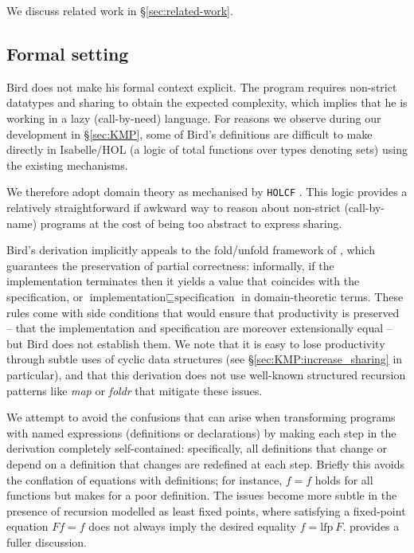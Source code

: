 \documentclass[11pt,a4paper]{article}
\begin{document}
We discuss related work in \S\ref{sec:related-work}.


\subsection{Formal setting\label{sec:formal_setting}}

Bird does not make his formal context explicit. The program requires
non-strict datatypes and sharing to obtain the expected complexity,
which implies that he is working in a lazy (call-by-need)
language. For reasons we observe during our development in
\S\ref{sec:KMP}, some of Bird's definitions are difficult to make
directly in Isabelle/HOL (a logic of total functions over types
denoting sets) using the existing mechanisms.

We therefore adopt domain theory as mechanised by \texttt{HOLCF}
\citep{HOLCF:1999}. This logic provides a relatively straightforward
if awkward way to reason about non-strict (call-by-name) programs at
the cost of being too abstract to express sharing.

Bird's derivation implicitly appeals to the fold/unfold framework of
\citet{BurstallDarlington:1977}, which guarantees the preservation of
partial correctness: informally, if the implementation terminates then
it yields a value that coincides with the specification, or
$\mbox{implementation} \sqsubseteq \mbox{specification}$ in
domain-theoretic terms. These rules come with side conditions that
would ensure that productivity is preserved -- that the implementation
and specification are moreover extensionally equal -- but Bird does
not establish them. We note that it is easy to lose productivity
through subtle uses of cyclic data structures (see
\S\ref{sec:KMP:increase_sharing} in particular), and that this
derivation does not use well-known structured recursion patterns like
\emph{map} or \emph{foldr} that mitigate these issues.

We attempt to avoid the confusions that can arise when transforming
programs with named expressions (definitions or declarations) by
making each step in the derivation completely self-contained:
specifically, all definitions that change or depend on a definition
that changes are redefined at each step. Briefly this avoids the
conflation of equations with definitions; for instance, $f = f$ holds
for all functions but makes for a poor definition. The issues become
more subtle in the presence of recursion modelled as least fixed
points, where satisfying a fixed-point equation $F f = f$ does not
always imply the desired equality $f = \mbox{lfp}\
F$. \citet{Tullsen:PhDThesis} provides a fuller discussion.
\end{document}
